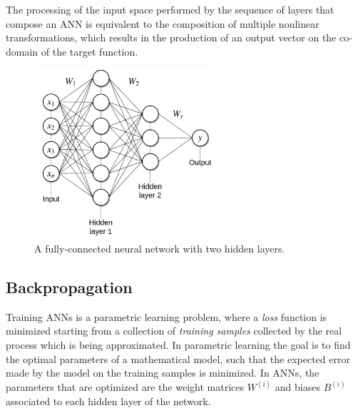 The processing of the input space performed by the sequence of layers that 
compose an ANN is equivalent to the composition of multiple nonlinear 
transformations, which results in the production of an output vector on the 
co-domain of the target function.
%
\begin{figure}
    \includegraphics[width=0.6\textwidth]{pictures/ann}
    \centering
    \caption[A fully-connected neural network with two hidden layers]{A 
	     fully-connected neural network with two hidden layers.}
    \label{f:ann}
\end{figure}
%

\subsection{Backpropagation}
Training ANNs is a parametric learning problem, where a \textit{loss} function 
is minimized starting from a collection of \textit{training samples} collected 
by the real process which is being approximated. In parametric learning the goal
is to find the optimal parameters of a mathematical model, such that the 
expected error made by the model on the training samples is minimized.
In ANNs, the parameters that are optimized are the weight matrices $W^{(i)}$ 
and biases $B^{(i)}$ associated to each hidden layer of the network. 

